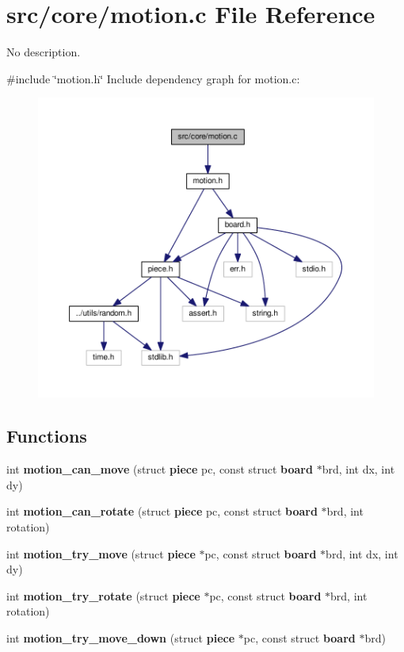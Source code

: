 \section{src/core/motion.c File Reference}
\label{motion_8c}


No description.  


{\ttfamily \#include \char`\"{}motion.\+h\char`\"{}}\newline
Include dependency graph for motion.\+c\+:
\nopagebreak
\begin{figure}[H]
\begin{center}
\leavevmode
\includegraphics[width=350pt]{motion_8c__incl}
\end{center}
\end{figure}
\subsection*{Functions}
\begin{DoxyCompactItemize}
\item 
int \textbf{ motion\+\_\+can\+\_\+move} (struct \textbf{ piece} pc, const struct \textbf{ board} $\ast$brd, int dx, int dy)
\item 
int \textbf{ motion\+\_\+can\+\_\+rotate} (struct \textbf{ piece} pc, const struct \textbf{ board} $\ast$brd, int rotation)
\item 
int \textbf{ motion\+\_\+try\+\_\+move} (struct \textbf{ piece} $\ast$pc, const struct \textbf{ board} $\ast$brd, int dx, int dy)
\item 
int \textbf{ motion\+\_\+try\+\_\+rotate} (struct \textbf{ piece} $\ast$pc, const struct \textbf{ board} $\ast$brd, int rotation)
\item 
int \textbf{ motion\+\_\+try\+\_\+move\+\_\+down} (struct \textbf{ piece} $\ast$pc, const struct \textbf{ board} $\ast$brd)
\end{DoxyCompactItemize}


